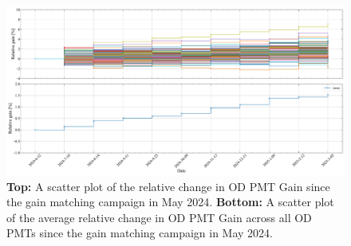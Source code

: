 \begin{figure}[ht!]
    \centering
    \includegraphics[width=\textwidth]{figures/ODCommissioning/RelativegainOverTime_AllPMTs_Both_Full_WS2024May2024Onwards.pdf}
    \caption{\textbf{Top:} A scatter plot of the relative change in OD PMT Gain since the gain matching campaign in May 2024. \textbf{Bottom:} A scatter plot of the average relative change in OD PMT Gain across all OD PMTs since the gain matching campaign in May 2024.}
    \label{fig:ODCommissioning/RelativeGain_WS2024May2024Onwards}
\end{figure}
\fi

